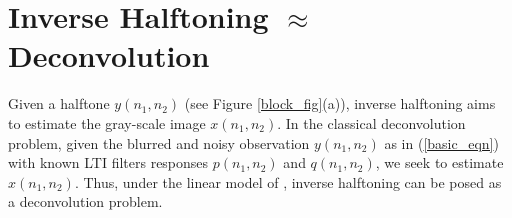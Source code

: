 \documentclass[11pt]{article}
\def\nnnx {n_1}
\def\nnny {n_2}
\def\fffx {f_1}
\def\fffy {f_2}
\begin{document}
\begin{comment}
\begin{figure}[tb]
\begin{center}
\epsfig{figure=figures/FloydFreq.eps,width=3in}
\end{center}
\caption[Original model]{\small \sl {Radially-averaged frequency
response magnitudes $|P(\fffx,\fffy)|$ (solid line) and
$|Q(\fffx,\fffy)|$ (dotted line) of the filters used in the linear
approximation model (with $K=2.03$) \cite{Kite} for Floyd
\cite{Floyd}. The high-pass $|P(\fffx,\fffy)|$ explains the sharpened
edges, while the high-pass $|Q(\fffx,\fffy)|$ explains the ``blue
noise'' behavior in Floyd halftones.}}
\label{floydfreq}
\end{figure}
\end{comment}


\section{Inverse Halftoning $\approx$ Deconvolution}
\label{IHTDecon}
Given a halftone $y(\nnnx,\nnny)$ (see Figure \ref{block_fig}(a)),
inverse halftoning aims to estimate the gray-scale image
$x(\nnnx,\nnny)$. In the classical deconvolution problem, given the
blurred and noisy observation $y(\nnnx,\nnny)$ as in
(\ref{basic_eqn}) with known LTI filters responses $p(\nnnx,\nnny)$
and $q(\nnnx,\nnny)$, we seek to estimate $x(\nnnx,\nnny)$. Thus,
under the linear model of \cite{Kite,KiteJournal}, inverse halftoning
can be posed as a deconvolution problem.
\end{document}
